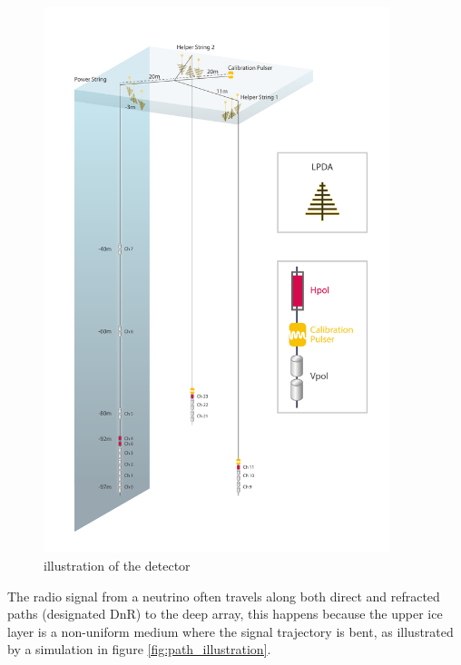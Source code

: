 \documentclass[11pt,a4paper,faculty=we,language=en,doctype=report]{cls/ugent-doc}
\begin{document}
\begin{figure}
	\includegraphics[width=0.9\textwidth]{figures/detector.pdf}	
	\caption{illustration of the detector}
	\label{fig:detector}
\end{figure}
\newpage
The radio signal from a neutrino often travels along both direct and refracted paths (designated DnR) to the deep array, this happens because the upper ice layer is a non-uniform medium where the signal trajectory is bent, as illustrated by a simulation in figure \ref{fig:path_illustration}. 
\end{document}
